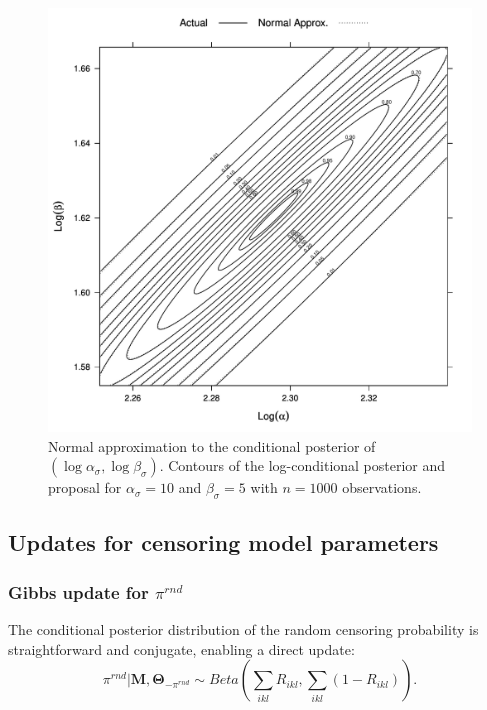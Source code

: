 \begin{figure}
\centering
\includegraphics[width=\textwidth]{figures/proteomics/gamma_normal_approx}

\caption{Normal approximation to the conditional posterior of $(\log \alpha_\sigma, \log \beta_\sigma)$. Contours of the log-conditional posterior and proposal for $\alpha_\sigma=10$ and $\beta_\sigma=5$ with $n=1000$ observations.\label{supp:proteomics:fig:Normal-approximation-to-log-gamma-pars}} 
\end{figure}




\subsection{Updates for censoring model parameters}


\subsubsection{Gibbs update for $\pi^{rnd}$}

The conditional posterior distribution of the random censoring probability is straightforward and conjugate, enabling a direct update:
\begin{equation*}
\pi^{rnd} | \bm M, \bm \Theta_{-\pi^{rnd}} \sim Beta\left( \sum_{ikl} R_{ikl}, \sum_{ikl} (1 - R_{ikl}) \right) .
\end{equation*}


